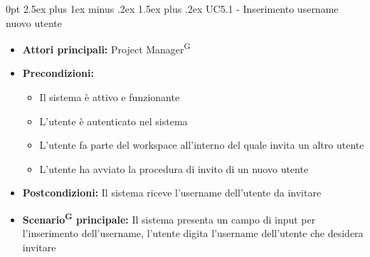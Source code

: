 \documentclass[a4paper, 11pt]{article}
\makeatletter
\renewcommand\paragraph{\@startsection{paragraph}{4}
  {0pt}
  {2.5ex plus 1ex minus .2ex}
  {1.5ex plus .2ex}
  {\normalfont\normalsize\bfseries\color{AccentDark}}}
\makeatother
\begin{document}
\paragraph{UC5.1 - Inserimento username nuovo utente}\label{UC5.1}
\begin{itemize}
	\item \textbf{Attori principali:} Project Manager\textsuperscript{G}
	\item \textbf{Precondizioni:} 
	\begin{itemize}
		\item Il sistema è attivo e funzionante
		\item L'utente è autenticato nel sistema
        \item L'utente fa parte del workspace all'interno del quale invita un altro utente
        \item L'utente ha avviato la procedura di invito di un nuovo utente
	\end{itemize}
    \item \textbf{Postcondizioni:} Il sistema riceve l'username dell'utente da invitare
	\item \textbf{Scenario\textsuperscript{G} principale:} Il sistema presenta un campo di input per l'inserimento dell'username, l'utente digita l'username dell'utente che desidera invitare
	
\end{itemize}
\end{document}
